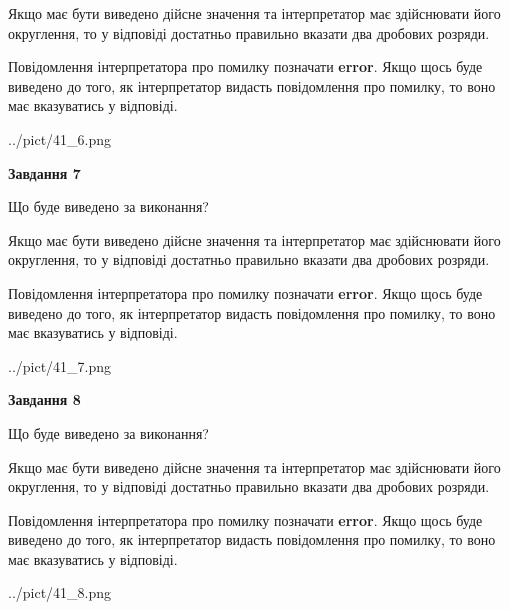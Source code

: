 \documentclass[12pt, ukrainian]{article}
\begin{document}
{\begin {Large}
Якщо має бути виведено дійсне значення та інтерпретатор має здійснювати його округлення, 
то у відповіді достатньо правильно вказати два дробових розряди.

Повідомлення інтерпретатора про помилку позначати \textbf{error}.
Якщо щось буде виведено до того, як інтерпретатор видасть повідомлення про помилку, 
то воно має вказуватись у відповіді. \par

\begin{center}
	{../pict/41_6.png}
\end{center}
\newpage

{\begin {center}\textbf{Завдання 7}\end {center}}\par
Що буде виведено за виконання? \par

Якщо має бути виведено дійсне значення та інтерпретатор має здійснювати його округлення, 
то у відповіді достатньо правильно вказати два дробових розряди.

Повідомлення інтерпретатора про помилку позначати \textbf{error}.
Якщо щось буде виведено до того, як інтерпретатор видасть повідомлення про помилку, 
то воно має вказуватись у відповіді. \par

\begin{center}
	{../pict/41_7.png}
\end{center}
\newpage

{\begin {center}\textbf{Завдання 8}\end {center}}\par
Що буде виведено за виконання? \par

Якщо має бути виведено дійсне значення та інтерпретатор має здійснювати його округлення, 
то у відповіді достатньо правильно вказати два дробових розряди.

Повідомлення інтерпретатора про помилку позначати \textbf{error}.
Якщо щось буде виведено до того, як інтерпретатор видасть повідомлення про помилку, 
то воно має вказуватись у відповіді. \par

\begin{center}
	{../pict/41_8.png}
\end{center}
\newpage


\end{Large}}
\end{document}
